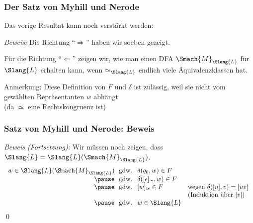 \documentclass[aspectratio=1610,onlymath]{beamer}
\begin{document}
\begin{frame}\frametitle{Der Satz von Myhill und Nerode}

Das vorige Resultat kann noch verstärkt werden:

\pause

\emph{Beweis:}
Die Richtung "`$\Rightarrow$"' haben wir soeben gezeigt.\pause\medskip

Für die Richtung "`$\Leftarrow$"' zeigen wir, wie man einen DFA $\Smach{M}_{\Slang{L}}$ für $\Slang{L}$ erhalten kann, wenn $\simeq_{\Slang{L}}$ endlich viele Äquivalenzklassen hat.\pause

\vspace{-1ex}
{\tiny Anmerkung: Diese Definition von $F$ und $\delta$ ist zulässig, weil sie nicht vom gewählten Repräsentanten $w$ abhängt}\\[-1.5ex]{\tiny (da $\simeq$ eine Rechtskongruenz ist)}

\end{frame}


\begin{frame}\frametitle{Satz von Myhill und Nerode: Beweis}

\emph{Beweis (Fortsetzung):} Wir müssen noch zeigen, dass $\Slang{L}=\Slang{L}(\Smach{M}_{\Slang{L}})$.
%
\[\begin{array}{r@{~\text{ gdw. }~}ll}
w\in\Slang{L}(\Smach{M}_{\Slang{L}}) & \delta(q_0,w)\in F \\\pause
	& \delta([\epsilon]_\simeq,w)\in F \\\pause
	& [w]_\simeq\in F & \text{wegen $\delta([u],v)=[uv]$ }\\
	\multicolumn{2}{c}{} & \text{(Induktion über $|v|$) }\\\pause
	& w\in \Slang{L}
\end{array}
\]
\qed

\end{frame}
\end{document}
